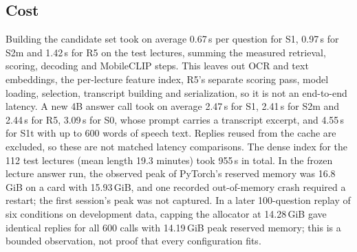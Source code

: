 \subsection{Cost}
\label{sec:cost}
Building the candidate set took on average 0.67\,s per question for S1, 0.97\,s for S2m and 1.42\,s for R5 on the test lectures, summing the measured retrieval, scoring, decoding and MobileCLIP steps.
This leaves out OCR and text embeddings, the per-lecture feature index, R5's separate scoring pass, model loading, selection, transcript building and serialization, so it is not an end-to-end latency.
A new 4B answer call took on average 2.47\,s for S1, 2.41\,s for S2m and 2.44\,s for R5, 3.09\,s for S0, whose prompt carries a transcript excerpt, and 4.55\,s for S1t with up to 600 words of speech text.
Replies reused from the cache are excluded, so these are not matched latency comparisons.
The dense index for the 112 test lectures (mean length 19.3 minutes) took 955\,s in total.
In the frozen lecture answer run, the observed peak of PyTorch's reserved memory was 16.8\,GiB on a card with 15.93\,GiB, and one recorded out-of-memory crash required a restart; the first session's peak was not captured.
In a later 100-question replay of six conditions on development data, capping the allocator at 14.28\,GiB gave identical replies for all 600 calls with 14.19\,GiB peak reserved memory; this is a bounded observation, not proof that every configuration fits.
